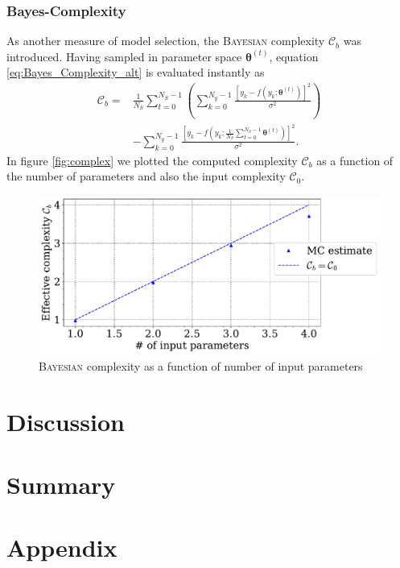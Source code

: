 \documentclass[%
 reprint,
 amsmath,amssymb,
 aps,
]{revtex4-1}
\newcommand{\btheta}{\boldsymbol{\theta}}
\begin{document}
\subsubsection{\textbf{Bayes-Complexity}}
As another measure of model selection, the \textsc{Bayesian} complexity $\mathcal{C}_b$ was introduced. Having sampled in parameter space $\btheta^{(t)}$, equation \eqref{eq:Bayes_Complexity_alt} is evaluated instantly as \cite{wuerz} \begin{align*}\mathcal{C}_b=&\frac{1}{N_S}\sum_{t=0}^{N_S-1}\left(\sum_{k=0}^{N_y-1}\frac{[y_k-f(y_k;\btheta^{(t)})]^2}{\sigma^2}\right)\\&-\sum_{k=0}^{N_y-1}\frac{[y_k-f(y_k;\frac{1}{N_S}\sum_{t=0}^{N_S-1}\btheta^{(t)})]^2}{\sigma^2}.\end{align*}
In figure \eqref{fig:complex} we plotted the computed complexity $\mathcal{C}_b$ as a function of the number of parameters and also the input complexity $\mathcal{C}_0$.

\begin{figure}[htbp]
	\centering
	\includegraphics[width=\linewidth]{_sigma_07acomplexity.pdf}
	\caption{\textsc{Bayesian} complexity as a function of number of input parameters}
	\label{fig:complex}
\end{figure}
\section{Discussion}

\section{Summary}
\section{Appendix}
\newpage


\end{document}
